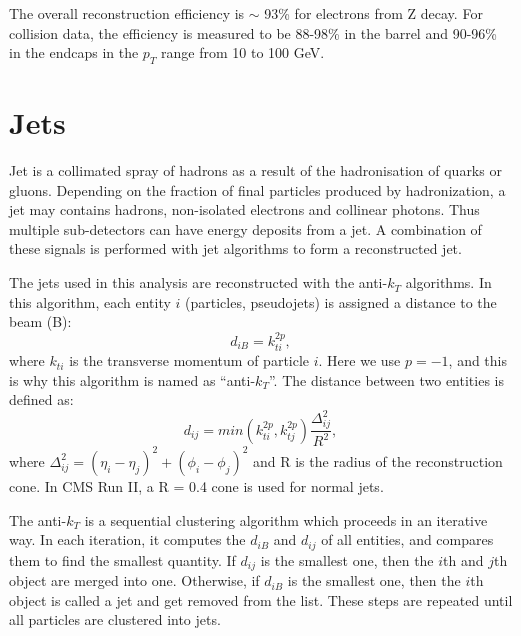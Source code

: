 \documentclass[thesis.tex]{subfiles}
\begin{document}
The overall reconstruction efficiency is $\sim$ 93\% for electrons from Z decay.
For collision data, the efficiency is measured to be 88-98\% in the barrel and 90-96\% in the endcaps in the $p_T$ range from 10 to 100 GeV.

\section{Jets}
Jet is a collimated spray of hadrons as a result of the hadronisation of quarks or gluons. 
Depending on the fraction of final particles produced by hadronization, a jet may contains hadrons, non-isolated electrons and collinear photons. 
Thus multiple sub-detectors can have energy deposits from a jet.
A combination of these signals is performed with jet algorithms to form a reconstructed jet. 

The jets used in this analysis are reconstructed with the anti-$k_T$ algorithms. 
In this algorithm, each entity $i$ (particles, pseudojets) is assigned a distance to the beam (B): 
\begin{equation}
	d_{iB} = k_{ti}^{2p},
\end{equation}
where $k_{ti}$ is the transverse momentum of particle $i$. Here we use $p = -1$, and this is why this algorithm is named as ``anti-$k_T$''. 
The distance between two entities is defined as:
\begin{equation}
	d_{ij} = min(k_{ti}^{2p}, k_{tj}^{2p})\frac{\Delta_{ij}^2}{R^2},
\end{equation}
where $\Delta_{ij}^2 = (\eta_i - \eta_j)^2 + (\phi_i - \phi_j)^2$ and R is the radius of the reconstruction cone. 
In CMS Run II, a R = 0.4 cone is used for normal jets. 

The anti-$k_T$ is a sequential clustering algorithm which proceeds in an iterative way.
In each iteration, it computes the $d_{iB}$ and $d_{ij}$ of all entities, and compares them to find the smallest quantity.  
If $d_{ij}$ is the smallest one, then the $i$th and $j$th object are merged into one. 
Otherwise, if $d_{iB}$ is the smallest one, then the $i$th object is called a jet and get removed from the list. 
These steps are repeated until all particles are clustered into jets. 


  
\end{document}
